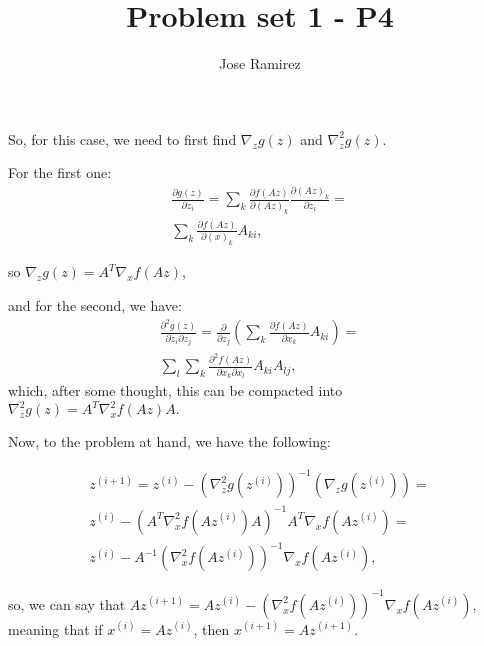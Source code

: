\documentclass{article}
\title{Problem set 1 - P4}
\author{Jose Ramirez}
\begin{document}
\maketitle

So, for this case, we need to first find $\nabla_z g(z)$ and $\nabla^2_{z} g(z)$.

For the first one:
\begin{eqnarray*}
	\frac{\partial g(z)}{\partial z_i} = \sum_k \frac{\partial f(Az)}{\partial(Az)_k} \frac{\partial (Az)_k}{\partial z_i} = \\
	\sum_k \frac{\partial f(Az)}{\partial(x)_k} A_{ki},
\end{eqnarray*}

so $\nabla_z g(z) = A^T \nabla_x f(Az)$,

and for the second, we have:
\begin{eqnarray*}
	\frac{\partial^2 g(z)}{\partial z_i \partial z_j} = \frac{\partial}{\partial z_j}\left( \sum_k \frac{\partial f(Az)}{\partial x_k} A_{ki} \right) = \\
	\sum_l \sum_k \frac{\partial^2 f(Az)}{\partial x_k \partial x_l} A_{ki} A_{lj},
\end{eqnarray*}
which, after some thought, this can be compacted into $\nabla^2_{z} g(z) = A^T \nabla^2_{x} f(Az) A.$

Now, to the problem at hand, we have the following:

\begin{eqnarray*}
	z^{(i + 1)} = z^{(i)} - (\nabla_z^2 g(z^{(i)}))^{-1}(\nabla_z g(z^{(i)})) = \\
	z^{(i)} - (A^T \nabla^2_{x} f(Az^{(i)}) A)^{-1} A^T \nabla_x f(Az^{(i)}) = \\
	z^{(i)} - A^{-1} (\nabla_x^2 f(Az^{(i)}))^{-1} \nabla_x f(Az^{(i)}), 
\end{eqnarray*}

so, we can say that $A z^{(i + 1)} = A z^{(i)} - (\nabla_x^2 f(Az^{(i)}))^{-1} \nabla_x f(Az^{(i)})$, meaning that if $x^{(i)} = A z^{(i)}$,
then $x^{(i + 1)} = A z^{(i + 1)}$.
\end{document}
